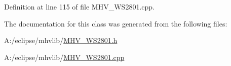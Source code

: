\-Definition at line 115 of file \-M\-H\-V\-\_\-\-W\-S2801.\-cpp.



\-The documentation for this class was generated from the following files\-:\begin{DoxyCompactItemize}
\item 
\-A\-:/eclipse/mhvlib/\hyperlink{_m_h_v___w_s2801_8h}{\-M\-H\-V\-\_\-\-W\-S2801.\-h}\item 
\-A\-:/eclipse/mhvlib/\hyperlink{_m_h_v___w_s2801_8cpp}{\-M\-H\-V\-\_\-\-W\-S2801.\-cpp}\end{DoxyCompactItemize}
